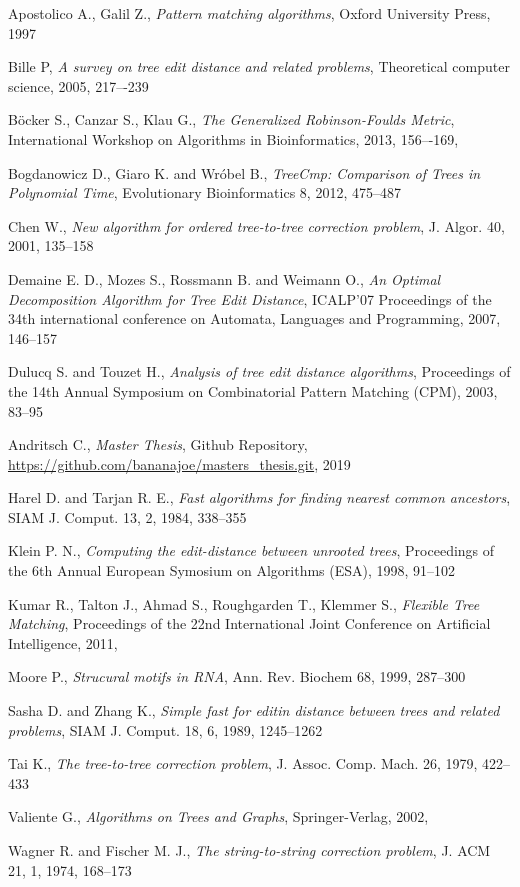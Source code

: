 \begin{thebibliography}{99}

  Apostolico A., Galil Z.,
  \textit{Pattern matching algorithms},
  Oxford University Press,
  1997
  
  Bille P,
  \textit{A survey on tree edit distance and related problems},
  Theoretical computer science,
  2005,
  217–-239
  
  Böcker S., Canzar S., Klau G.,
  \textit{The Generalized Robinson-Foulds Metric},
  International Workshop on Algorithms in Bioinformatics,
  2013,
  156–-169,
  
  Bogdanowicz D., Giaro K. and Wróbel B.,
  \textit{TreeCmp: Comparison of Trees in Polynomial Time},
  Evolutionary Bioinformatics 8,
  2012,
  475--487
   
  Chen W.,
  \textit{New algorithm for ordered tree-to-tree correction problem},
  J. Algor. 40,
  2001,
  135--158
  
  Demaine E. D., Mozes S., Rossmann B. and Weimann O.,
  \textit{An Optimal Decomposition Algorithm for Tree Edit Distance},
  ICALP'07 Proceedings of the 34th international conference on Automata, Languages and Programming,
  2007,
  146--157

  Dulucq S. and Touzet H.,
  \textit{Analysis of tree edit distance algorithms},
  Proceedings of the 14th Annual Symposium on Combinatorial Pattern Matching (CPM),
  2003,
  83--95
  
  Andritsch C.,
  \textit{Master Thesis},
  Github Repository,
  \url{https://github.com/bananajoe/masters_thesis.git},
  2019
  
  Harel D. and Tarjan R. E.,
  \textit{Fast algorithms for finding nearest common ancestors},
  SIAM J. Comput. 13, 2,
  1984,
  338--355
  
  Klein P. N.,
  \textit{Computing the edit-distance between unrooted trees}, 
  Proceedings of the 6th Annual European Symosium on Algorithms (ESA),
  1998,
  91--102
  
  Kumar R., Talton J., Ahmad S., Roughgarden T., Klemmer S.,
  \textit{Flexible Tree Matching},
  Proceedings of the 22nd International Joint Conference on Artificial Intelligence,
  2011,
  
  Moore P.,
  \textit{Strucural motifs in RNA},
  Ann. Rev. Biochem 68,
  1999,
  287--300
  
  Sasha D. and Zhang K.,
  \textit{Simple fast for editin distance between trees and related problems},
  SIAM J. Comput. 18, 6,
  1989,
  1245--1262
  
  Tai K.,
  \textit{The tree-to-tree correction problem},
  J. Assoc. Comp. Mach. 26,
  1979,
  422--433
  
  Valiente G.,
  \textit{Algorithms on Trees and Graphs},
  Springer-Verlag,
  2002,
  
  Wagner R. and Fischer M. J.,
  \textit{The string-to-string correction problem},
  J. ACM 21, 1,
  1974,
  168--173
  
\end{thebibliography}